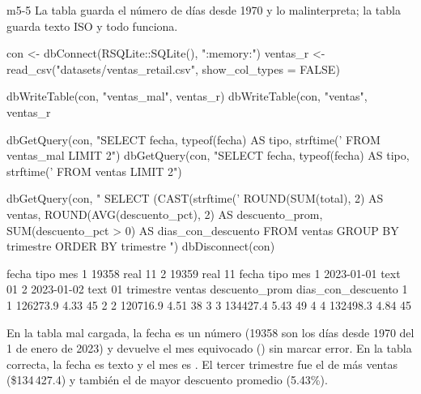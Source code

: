 \begin{solucion}{m5-5}
La tabla  guarda el número de días desde 1970 y
 lo malinterpreta; la tabla  guarda
texto ISO y todo funciona.

\begin{rcode}
con <- dbConnect(RSQLite::SQLite(), ":memory:")
ventas_r <- read_csv("datasets/ventas_retail.csv", show_col_types = FALSE)

dbWriteTable(con, "ventas_mal", ventas_r)
dbWriteTable(con, "ventas",
             ventas_r %

dbGetQuery(con, "SELECT fecha, typeof(fecha) AS tipo,
                        strftime('%
                 FROM ventas_mal LIMIT 2")
dbGetQuery(con, "SELECT fecha, typeof(fecha) AS tipo,
                        strftime('%
                 FROM ventas LIMIT 2")

dbGetQuery(con, "
  SELECT (CAST(strftime('%
         ROUND(SUM(total), 2)         AS ventas,
         ROUND(AVG(descuento_pct), 2) AS descuento_prom,
         SUM(descuento_pct > 0)       AS dias_con_descuento
  FROM ventas
  GROUP BY trimestre
  ORDER BY trimestre
")
dbDisconnect(con)
\end{rcode}

\begin{rsalida}
  fecha tipo mes
1 19358 real  11
2 19359 real  11
       fecha tipo mes
1 2023-01-01 text  01
2 2023-01-02 text  01
  trimestre   ventas descuento_prom dias_con_descuento
1         1 126273.9           4.33                 45
2         2 120716.9           4.51                 38
3         3 134427.4           5.43                 49
4         4 132498.3           4.84                 45
\end{rsalida}

En la tabla mal cargada, la fecha es un número (19358 son los días desde
1970 del 1 de enero de 2023) y  devuelve el mes
equivocado () sin marcar error. En la tabla correcta, la fecha es
texto y el mes es . El tercer trimestre fue el de más ventas
(\$134\,427.4) y también el de mayor descuento promedio (5.43\%).
\end{solucion}

